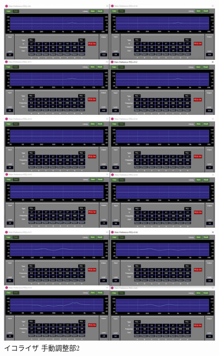 \documentclass[11pt,a4j]{jreport}
\begin{document}
\begin{figure}[H]
  \begin{minipage}[b]{.5\linewidth}
    \centering
    \includegraphics[width=.9\linewidth]{images/experimentField/afcParameters/base05manualEQ2_3.jpg}
  \end{minipage}%
  \begin{minipage}[b]{.5\linewidth}
    \centering
    \includegraphics[width=.9\linewidth]{images/experimentField/afcParameters/base05manualEQ2_4.jpg}
  \end{minipage}

  \begin{minipage}[b]{1\linewidth}
    \centering
    \includegraphics[width=.45\linewidth]{images/experimentField/afcParameters/base05manualEQ2_5.jpg}
  \end{minipage}

  \centering
  \caption{イコライザ 手動調整部2}
  \label{fig:イコライザ手動調整部2}
\end{figure}
\newpage
\end{document}
